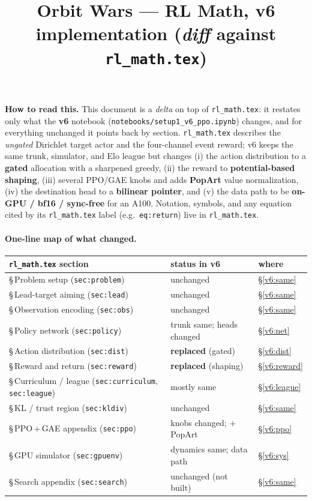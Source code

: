 \documentclass[11pt]{article}
\title{\textbf{Orbit Wars --- RL Math, v6 implementation (\emph{diff} against \texttt{rl\_math.tex})}}
\author{}
\date{}
\begin{document}
\maketitle

\noindent\textbf{How to read this.} This document is a \emph{delta} on top of \texttt{rl\_math.tex}: it
restates only what the \textbf{v6} notebook (\texttt{notebooks/setup1\_v6\_ppo.ipynb}) changes, and for
everything unchanged it points back by section. \texttt{rl\_math.tex} describes the \emph{ungated}
Dirichlet target actor and the four-channel event reward; v6 keeps the same trunk, simulator, and Elo
league but changes (i) the action distribution to a \textbf{gated} allocation with a sharpened greedy,
(ii) the reward to \textbf{potential-based shaping}, (iii) several PPO/GAE knobs and adds \textbf{PopArt}
value normalization, (iv) the destination head to a \textbf{bilinear pointer}, and (v) the data path to
be \textbf{on-GPU / bf16 / sync-free} for an A100. Notation, symbols, and any equation cited by its
\texttt{rl\_math.tex} label (e.g.\ \texttt{eq:return}) live in \texttt{rl\_math.tex}.

\paragraph{One-line map of what changed.}
\begin{center}
\small
\begin{tabular}{@{}lll@{}}
\toprule
\texttt{rl\_math.tex} section & status in v6 & where \\
\midrule
\S\,Problem setup (\texttt{sec:problem})            & unchanged                 & \S\ref{v6:same}\\
\S\,Lead-target aiming (\texttt{sec:lead})          & unchanged                 & \S\ref{v6:same}\\
\S\,Observation encoding (\texttt{sec:obs})         & unchanged                 & \S\ref{v6:same}\\
\S\,Policy network (\texttt{sec:policy})            & trunk same; heads changed & \S\ref{v6:net}\\
\S\,Action distribution (\texttt{sec:dist})         & \textbf{replaced} (gated)  & \S\ref{v6:dist}\\
\S\,Reward and return (\texttt{sec:reward})         & \textbf{replaced} (shaping)& \S\ref{v6:reward}\\
\S\,Curriculum / league (\texttt{sec:curriculum},\,\texttt{sec:league}) & mostly same & \S\ref{v6:league}\\
\S\,KL / trust region (\texttt{sec:kldiv})          & unchanged                 & \S\ref{v6:same}\\
\S\,PPO\,+\,GAE appendix (\texttt{sec:ppo})         & knobs changed; $+$PopArt  & \S\ref{v6:ppo}\\
\S\,GPU simulator (\texttt{sec:gpuenv})             & dynamics same; data path  & \S\ref{v6:sys}\\
\S\,Search appendix (\texttt{sec:search})           & unchanged (not built)     & \S\ref{v6:same}\\
\bottomrule
\end{tabular}
\end{center}
\end{document}
